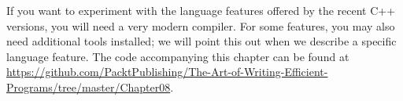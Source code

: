 If you want to experiment with the language features offered by the recent C++ versions, you will need a very modern compiler. For some features, you may also need additional tools installed; we will point this out when we describe a specific language feature. The code accompanying this chapter can be found at \url{https://github.com/PacktPublishing/The-Art-of-Writing-Efficient-Programs/tree/master/Chapter08}.